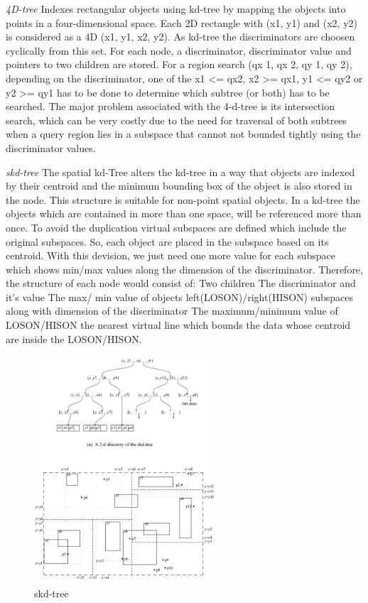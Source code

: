 \documentclass[a4paper,12pt]{article}
\begin{document}
\emph{4D-tree}
Indexes rectangular objects using kd-tree by mapping the objects into points in a four-dimensional space. Each 2D rectangle with (x1, y1) and (x2, y2) is considered as a 4D (x1, y1, x2, y2). As kd-tree the discriminators are choosen cyclically from this set. For each node, a discriminator, discriminator value and pointers to two children are stored. 
For a region search (qx 1, qx 2, qy 1, qy 2), depending on the discriminator, one of the x1 <= qx2, x2  >=  qx1, y1 <= qy2 or y2 >= qy1 has to be done to determine which subtree (or both) has to be searched.
The major problem associated with the 4-d-tree is its intersection search, which can be very costly due to the need for traversal of both subtrees when a query region lies in a subspace that cannot not bounded tightly using the discriminator values.

\emph{skd-tree}
The spatial kd-Tree alters the kd-tree in a way that objects are indexed by their centroid and the minimum bounding box of the object is also stored in the node. This structure is suitable for non-point spatial objects. In a kd-tree the objects which are contained in more than one space, will be referenced more than once. To avoid the duplication virtual subspaces are defined which include the original subspaces. So, each object are placed in the subspace based on its centroid.
With this devision, we just need one more value for each subspace which shows min/max values along the dimension of the discriminator. Therefore, the structure of each node would consist of:
Two children
The discriminator and it's value
The max/ min value of objects left(LOSON)/right(HISON) subspaces along with dimension of the discriminator
The maximum/minimum value of LOSON/HISON the nearest virtual line which bounds the data whose centroid are inside the LOSON/HISON.

\begin{figure}
\centering
\includegraphics[width=0.6\textwidth]{skdtree}
\caption{skd-tree}
\label{figskdtree}
\end{figure}
\end{document}
